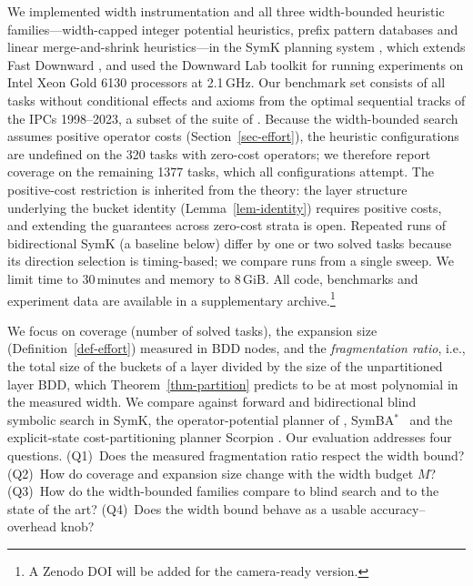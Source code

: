 \documentclass[letterpaper]{article}
\newcommand{\symba}{SymBA\ensuremath{^{*}}}
\theoremstyle{plain}
\theoremstyle{definition}
\theoremstyle{remark}
\begin{document}
We implemented width instrumentation and all three width-bounded
heuristic families---width-capped integer potential heuristics, prefix
pattern databases and linear merge-and-shrink heuristics---in the SymK
planning system \citep{speck-et-al-jair2025}, which extends Fast Downward
\citep{helmert-jair2006}, and used the Downward Lab toolkit
\citep{seipp-et-al-zenodo2017} for running experiments on Intel Xeon Gold
6130 processors at 2.1\,GHz. Our benchmark set consists of all tasks
without conditional effects and axioms from the optimal sequential tracks
of the IPCs 1998--2023, a subset of the suite of
\citet{fiser-et-al-aij2024}. Because the width-bounded search assumes
positive operator costs (Section~\ref{sec-effort}), the heuristic
configurations are undefined on the 320 tasks with zero-cost operators;
we therefore report coverage on the remaining 1377 tasks, which all
configurations attempt. The positive-cost restriction is inherited from the
theory: the layer structure underlying the bucket identity
(Lemma~\ref{lem-identity}) requires positive costs, and extending the
guarantees across zero-cost strata is open. Repeated runs of bidirectional SymK (a baseline below) differ by
one or two solved tasks because its direction selection is timing-based;
we compare runs from a single sweep. We limit time to 30\,minutes and memory to
8\,GiB. All code, benchmarks and experiment data are available in a
supplementary archive.\footnote{A Zenodo DOI will be added for the
camera-ready version.}

We focus on coverage (number of solved tasks), the expansion size
(Definition~\ref{def-effort}) measured in BDD nodes, and the
\emph{fragmentation ratio}, i.e., the total size of the buckets of a
layer divided by the size of the unpartitioned layer BDD, which
Theorem~\ref{thm-partition} predicts to be at most polynomial in the
measured width. We compare against forward and bidirectional blind
symbolic search in SymK, the operator-potential planner of
\citet{fiser-et-al-aij2024}, \symba\
\citep{torralba-et-al-aij2017} and the explicit-state cost-partitioning
planner Scorpion \citep{seipp-et-al-jair2020}. Our evaluation addresses
four questions. (Q1)~Does the measured fragmentation ratio respect the
width bound? (Q2)~How do coverage and expansion size change with the
width budget $M$? (Q3)~How do the width-bounded families compare to blind
search and to the state of the art? (Q4)~Does the width bound behave as a
usable accuracy--overhead knob?
\end{document}

